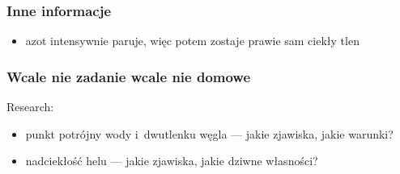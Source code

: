 \subsubsection*{Inne informacje}
\begin{itemize}
    \item azot intensywnie paruje, więc potem zostaje prawie sam ciekły tlen
\end{itemize}
\subsubsection*{Wcale nie zadanie wcale nie domowe}
Research:
\begin{itemize}
    \item punkt potrójny wody i~dwutlenku węgla --- jakie zjawiska, jakie warunki?
    \item nadciekłość helu --- jakie zjawiska, jakie dziwne własności?
\end{itemize}
